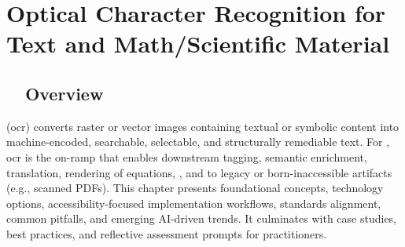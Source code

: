 \chapter{Optical Character Recognition for Text and Math/Scientific Material}
\label{chap:ocr}

\section{~~Overview}
\label{sec:ocr-overview}
 (\gls{ocr}) converts raster or vector images containing textual or symbolic content into machine-encoded, searchable, selectable, and structurally remediable text. For , \gls{ocr} is the on-ramp that enables downstream tagging, semantic enrichment,  translation,  rendering of equations,  , and  to legacy or born-inaccessible artifacts (e.g., scanned PDFs). This chapter presents foundational concepts, technology options, accessibility-focused implementation workflows, standards alignment, common pitfalls, and emerging AI-driven trends. It culminates with case studies, best practices, and reflective assessment prompts for practitioners.

